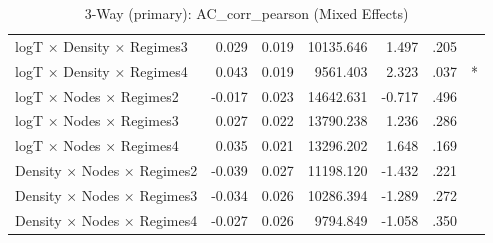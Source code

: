 \begin{table}[ht]
\begin{tabular}{lrrrrll}
  logT × Density × Regimes3 & 0.029 & 0.019 & 10135.646 & 1.497 & .205 &  \\ 
  logT × Density × Regimes4 & 0.043 & 0.019 & 9561.403 & 2.323 & .037 & * \\ 
  logT × Nodes × Regimes2 & -0.017 & 0.023 & 14642.631 & -0.717 & .496 &  \\ 
  logT × Nodes × Regimes3 & 0.027 & 0.022 & 13790.238 & 1.236 & .286 &  \\ 
  logT × Nodes × Regimes4 & 0.035 & 0.021 & 13296.202 & 1.648 & .169 &  \\ 
  Density × Nodes × Regimes2 & -0.039 & 0.027 & 11198.120 & -1.432 & .221 &  \\ 
  Density × Nodes × Regimes3 & -0.034 & 0.026 & 10286.394 & -1.289 & .272 &  \\ 
  Density × Nodes × Regimes4 & -0.027 & 0.026 & 9794.849 & -1.058 & .350 &  \\ 
   \hline
\end{tabular}
\caption{3-Way (primary): AC_corr_pearson (Mixed Effects)} 
\end{table}
